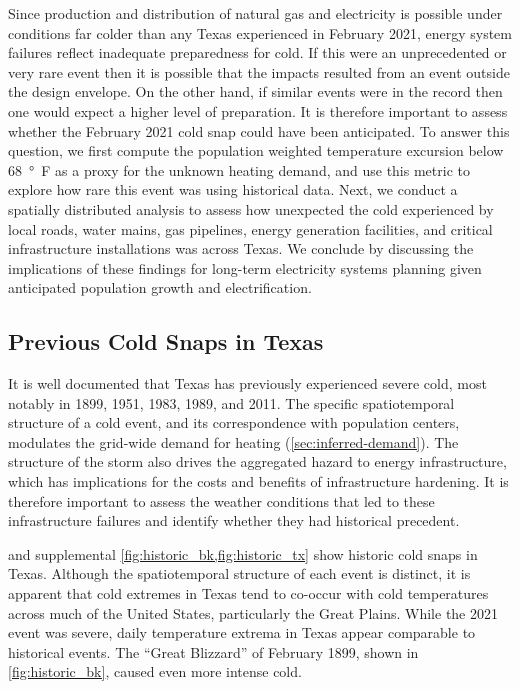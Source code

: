 \documentclass[12pt]{iopart}
\begin{document}
Since production and distribution of natural gas and electricity is possible under conditions far colder than any Texas experienced in February 2021, energy system failures reflect inadequate preparedness for cold.
If this were an unprecedented or very rare event then it is possible that the impacts resulted from an event outside the design envelope.
On the other hand, if similar events were in the record then one would expect a higher level of preparation.
It is therefore important to assess whether the February 2021 cold snap could have been anticipated.
To answer this question, we first compute the population weighted temperature excursion below \SI{68}{\degree F} as a proxy for the unknown heating demand, and use this metric to explore how rare this event was using historical data.
Next, we conduct a spatially distributed analysis to assess how unexpected the cold experienced by local roads, water mains, gas pipelines, energy generation facilities, and critical infrastructure installations was across Texas.
We conclude by discussing the implications of these findings for long-term electricity systems planning given anticipated population growth and electrification.

\subsection{Previous Cold Snaps in Texas}

It is well documented that Texas has previously experienced severe cold, most notably in 1899, 1951, 1983, 1989, and 2011.
The specific spatiotemporal structure of a cold event, and its correspondence with population centers, modulates the grid-wide demand for heating (\cref{sec:inferred-demand}).
The structure of the storm also drives the aggregated hazard to energy infrastructure, which has implications for the costs and benefits of infrastructure hardening.
It is therefore important to assess the weather conditions that led to these infrastructure failures and identify whether they had historical precedent.

 and supplemental \cref{fig:historic_bk,fig:historic_tx} show historic cold snaps in Texas.
Although the spatiotemporal structure of each event is distinct, it is apparent that cold extremes in Texas tend to co-occur with cold temperatures across much of the United States, particularly the Great Plains.
While the 2021 event was severe, daily temperature extrema in Texas appear comparable to historical events.
The ``Great Blizzard'' of February 1899, shown in \cref{fig:historic_bk}, caused even more intense cold.
\end{document}
